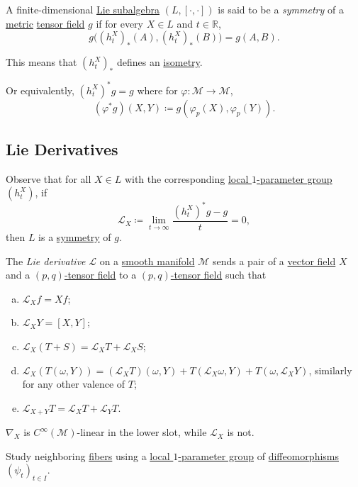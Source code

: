 \begin{definition}[Symmetry]\label{def:symmetry}
	A finite-dimensional \hyperref[def:Lie-subalgebra]{Lie subalgebra} \((L, [\cdot, \cdot])\) is said to be a \emph{symmetry} of a \hyperref[def:pseudo-Riemannian-metric]{metric} \hyperref[def:tensor-field]{tensor field} \(g\) if for every \(X\in L\) and \(t\in \mathbb{R} \),
	\[
		g\big( (h^X_t )_{\ast} (A), (h^X_t )_{\ast} (B) \big) = g(A, B).
	\]
\end{definition}

This means that \((h^X_t)_{\ast} \) defines an \hyperref[def:isometry]{isometry}.

\begin{note}
	Or equivalently, \((h^X_t)^{\ast} g = g\) where for \(\varphi \colon \mathcal{M} \to \mathcal{M} \),
	\[
		(\varphi ^{\ast} g)(X, Y) \coloneqq g(\varphi _p (X), \varphi _p(Y)).
	\]
\end{note}

\subsection{Lie Derivatives}\label{subsection:Lie-Derivatives}
Observe that for all \(X\in L\) with the corresponding \hyperref[def:local-1-parameter-group]{local \(1\)-parameter group} \((h^X_t)\), if
\[
	\mathcal{L} _X \coloneqq \lim_{t \to \infty} \frac{(h^X_t)^{\ast} g - g}{t} = 0,
\]
then \(L\) is a \hyperref[def:symmetry]{symmetry} of \(g\).

\begin{definition}\label{def:Lie-derivative}
	The \emph{Lie derivative} \(\mathcal{L} \) on a \hyperref[def:smooth-manifold]{smooth manifold} \(\mathcal{M} \) sends a pair of a \hyperref[def:vector-field]{vector field} \(X\) and a \hyperref[def:tensor-field]{\((p, q)\)-tensor field} to a \hyperref[def:tensor-field]{\((p, q)\)-tensor field} such that
	\begin{enumerate}[(a)]
		\item \(\mathcal{L} _X f = Xf\);
		\item \(\mathcal{L} _X Y = [X, Y]\);
		\item \(\mathcal{L} _X(T + S) = \mathcal{L} _X T + \mathcal{L} _X S\);
		\item \(\mathcal{L} _X(T(\omega , Y)) = (\mathcal{L} _X T)(\omega , Y) + T(\mathcal{L} _X \omega , Y) + T(\omega , \mathcal{L} _X Y)\), similarly for any other valence of \(T\);
		\item \(\mathcal{L} _{X+Y} T = \mathcal{L} _X T + \mathcal{L} _Y T\).
	\end{enumerate}
\end{definition}

\begin{remark}
	\(\nabla _X\) is \(C^{\infty} (\mathcal{M} )\)-linear in the lower slot, while \(\mathcal{L} _X\) is not.
\end{remark}

\begin{intuition}
	Study neighboring \hyperref[def:fiber]{fibers} using a \hyperref[def:local-1-parameter-group]{local \(1\)-parameter group} of \hyperref[def:diffeomorphism]{diffeomorphisms} \((\psi _t)_{t\in I}\).
\end{intuition}